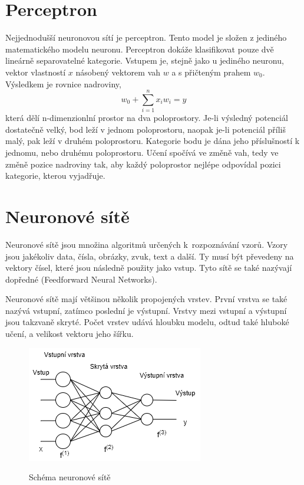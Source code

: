 \section{Perceptron}
Nejjednodušší neuronovou sítí je perceptron.
Tento model je složen z jediného matematického modelu neuronu.
Perceptron dokáže klasifikovat pouze dvě lineárně separovatelné kategorie.
Vstupem je, stejně jako u jediného neuronu, vektor vlastností $x$
násobený vektorem vah $ w $ a s přičteným prahem $ w_0 $.
Výsledkem je rovnice nadroviny,
$$ w_0 + \sum_{i=1}^{n} x_{i}w_{i} = y$$
která dělí n-dimenzionlní prostor na dva poloprostory.
Je-li výsledný potenciál dostatečně velký, bod leží v jednom poloprostoru,
naopak je-li potenciál příliš malý, pak leží v druhém poloprostoru.
Kategorie bodu je dána jeho příslušností k jednomu, nebo druhému poloprostoru.
Učení spočívá ve změně vah, tedy ve změně pozice nadroviny tak,
aby každý poloprostor nejlépe odpovídal pozici kategorie, 
kterou vyjadřuje. 
\cite{Goodfellow-et-al-2016, Nicholson_Perceptron, Chalupnik_NeuronoveSite}

\section{Neuronové sítě}
Neuronové sítě jsou množina algoritmů určených k~rozpoznávání vzorů.
Vzory jsou jakékoliv data, čísla, obrázky, zvuk, text a další.
Ty musí být převedeny na vektory čísel, 
které jsou následně použity jako vstup.
Tyto sítě se také nazývají dopředné (Feedforward Neural Networks).
\cite{Nicholson_NeuralNets}
\par

Neuronové sítě mají většinou několik propojených vrstev.
První vrstva se také nazývá vstupní, 
zatímco poslední je výstupní.
Vrstvy mezi vstupní a výstupní jsou takzvaně skryté.
Počet vrstev udává hloubku modelu, odtud také hluboké učení, 
a velikost vektoru jeho šířku.

\begin{figure}[h]\centering
    \centering
    \includegraphics[width=0.6\linewidth]{obrazky/NNSchema.png}\\[1pt]  
    \caption{Schéma neuronové sítě}    
    \label{obrazekSchemaNeuronoveSite}
\end{figure}

